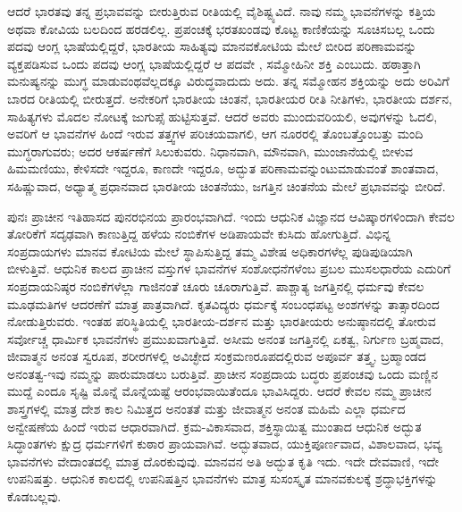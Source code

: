 ಆದರೆ ಭಾರತವು ತನ್ನ ಪ್ರಭಾವವನ್ನು ಬೀರುತ್ತಿರುವ ರೀತಿಯಲ್ಲಿ ವೈಶಿಷ್ಟ್ಯವಿದೆ. ನಾವು ನಮ್ಮ ಭಾವನೆಗಳನ್ನು ಕತ್ತಿಯ ಅಥವಾ ಕೋವಿಯ ಬಲದಿಂದ ಹರಡಲಿಲ್ಲ. ಪ್ರಪಂಚಕ್ಕೆ ಭರತಖಂಡವು ಕೊಟ್ಟ ಕಾಣಿಕೆಯನ್ನು ಸೂಚಿಸಬಲ್ಲ ಒಂದು ಪದವು ಆಂಗ್ಲ ಭಾಷೆಯಲ್ಲಿದ್ದರೆ, ಭಾರತೀಯ ಸಾಹಿತ್ಯವು ಮಾನವಕೋಟಿಯ ಮೇಲೆ ಬೀರಿದ ಪರಿಣಾಮವನ್ನು ವ್ಯಕ್ತಪಡಿಸುವ ಒಂದು ಪದವು ಆಂಗ್ಲ ಭಾಷೆಯಲ್ಲಿದ್ದರೆ ಆ ಪದವೇ , ಸಮ್ಮೋಹಿನೀ ಶಕ್ತಿ ಎಂಬುದು. ಹಠಾತ್ತಾಗಿ ಮನುಷ್ಯನನ್ನು ಮುಗ್ಧ ಮಾಡುವಂಥವೆಲ್ಲದಕ್ಕೂ ವಿರುದ್ಧವಾದುದು ಅದು. ತನ್ನ ಸಮ್ಮೋಹನ ಶಕ್ತಿಯನ್ನು ಅದು ಅರಿವಿಗೆ ಬಾರದ ರೀತಿಯಲ್ಲಿ ಬೀರುತ್ತದೆ. ಅನೇಕರಿಗೆ ಭಾರತೀಯ ಚಿಂತನೆ, ಭಾರತೀಯರ ರೀತಿ ನೀತಿಗಳು, ಭಾರತೀಯ ದರ್ಶನ, ಸಾಹಿತ್ಯಗಳು ಮೊದಲ ನೋಟಕ್ಕೆ ಜುಗುಪ್ಸೆ ಹುಟ್ಟಿಸುತ್ತವೆ. ಆದರೆ ಅವರು ಮುಂದುವರಿಯಲಿ, ಅವುಗಳನ್ನು ಓದಲಿ, ಅವರಿಗೆ ಆ ಭಾವನೆಗಳ ಹಿಂದೆ ಇರುವ ತತ್ತ್ವಗಳ ಪರಿಚಯವಾಗಲಿ, ಆಗ ನೂರರಲ್ಲಿ ತೊಂಬತ್ತೊಂಬತ್ತು ಮಂದಿ ಮುಗ್ಧರಾಗುವರು; ಅದರ ಆಕರ್ಷಣೆಗೆ ಸಿಲುಕುವರು. ನಿಧಾನವಾಗಿ, ಮೌನವಾಗಿ, ಮುಂಜಾನೆಯಲ್ಲಿ ಬೀಳುವ ಹಿಮಮಣಿಯು, ಕೇಳಿಸದೇ ಇದ್ದರೂ, ಕಾಣದೇ ಇದ್ದರೂ, ಅದ್ಭುತ ಪರಿಣಾಮವನ್ನುಂಟುಮಾಡುವಂತೆ ಶಾಂತವಾದ, ಸಹಿಷ್ಣುವಾದ, ಅಧ್ಯಾತ್ಮ ಪ್ರಧಾನವಾದ ಭಾರತೀಯ ಚಿಂತನೆಯು, ಜಗತ್ತಿನ ಚಿಂತನೆಯ ಮೇಲೆ ಪ್ರಭಾವವನ್ನು ಬೀರಿದೆ.

ಪುನಃ ಪ್ರಾಚೀನ ಇತಿಹಾಸದ ಪುನರಭಿನಯ ಪ್ರಾರಂಭವಾಗಿದೆ. ಇಂದು ಆಧುನಿಕ ವಿಜ್ಞಾನದ ಆವಿಷ್ಕಾರಗಳಿಂದಾಗಿ ಕೇವಲ ತೋರಿಕೆಗೆ ಸದೃಢವಾಗಿ ಕಾಣುತ್ತಿದ್ದ ಹಳೆಯ ನಂಬಿಕೆಗಳ ಅಡಿಪಾಯವೇ ಕುಸಿದು ಹೋಗುತ್ತಿದೆ. ವಿಭಿನ್ನ ಸಂಪ್ರದಾಯಗಳು ಮಾನವ ಕೋಟಿಯ ಮೇಲೆ ಸ್ಥಾಪಿಸುತ್ತಿದ್ದ ತಮ್ಮ ವಿಶೇಷ ಅಧಿಕಾರಗಳೆಲ್ಲ ಪುಡಿಪುಡಿಯಾಗಿ ಬೀಳುತ್ತಿವೆ. ಆಧುನಿಕ ಕಾಲದ ಪ್ರಾಚೀನ ವಸ್ತುಗಳ ಭಾವನೆಗಳ ಸಂಶೋಧನೆಗಳೆಂಬ ಪ್ರಬಲ ಮುಸಲಧಾರೆಯ ಎದುರಿಗೆ ಸಂಪ್ರದಾಯನಿಷ್ಠರ ನಂಬಿಕೆಗಳೆಲ್ಲಾ ಗಾಜಿನಂತೆ ಚೂರು ಚೂರಾಗುತ್ತಿವೆ. ಪಾಶ್ಚಾತ್ಯ ಜಗತ್ತಿನಲ್ಲಿ ಧರ್ಮವು ಕೇವಲ ಮೂಢಮತಿಗಳ ಆದರಣೆಗೆ ಮಾತ್ರ ಪಾತ್ರವಾಗಿದೆ. ಕೃತವಿದ್ಯರು ಧರ್ಮಕ್ಕೆ ಸಂಬಂಧಪಟ್ಟ ಅಂಶಗಳನ್ನು ತಾತ್ಸಾರದಿಂದ ನೋಡುತ್ತಿರುವರು. ಇಂತಹ ಪರಿಸ್ಥಿತಿಯಲ್ಲಿ ಭಾರತೀಯ-ದರ್ಶನ ಮತ್ತು ಭಾರತೀಯರು ಅನುಷ್ಠಾನದಲ್ಲಿ ತೋರುವ ಸರ್ವೋಚ್ಚ ಧಾರ್ಮಿಕ ಭಾವನೆಗಳು ಪ್ರಮುಖವಾಗುತ್ತಿವೆ. ಅಸೀಮ ಅನಂತ ಜಗತ್ತಿನಲ್ಲಿ ಏಕತ್ವ, ನಿರ್ಗುಣ ಬ್ರಹ್ಮವಾದ, ಜೀವಾತ್ಮನ ಅನಂತ ಸ್ವರೂಪ, ಶರೀರಗಳಲ್ಲಿ ಅವಿಚ್ಛೇದ ಸಂಕ್ರಮಣರೂಪದಲ್ಲಿರುವ ಅಪೂರ್ವ ತತ್ತ್ವ, ಬ್ರಹ್ಮಾಂಡದ ಅನಂತತ್ವ-ಇವು ನಮ್ಮನ್ನು ಪಾರುಮಾಡಲು ಬರುತ್ತಿವೆ. ಪ್ರಾಚೀನ ಸಂಪ್ರದಾಯ ಬದ್ಧರು ಪ್ರಪಂಚವು ಒಂದು ಮಣ್ಣಿನ ಮುದ್ದೆ ಎಂದೂ ಸೃಷ್ಟಿ ಮೊನ್ನೆ ಮೊನ್ನೆಯಷ್ಟೆ ಆರಂಭವಾಯಿತೆಂದೂ ಭಾವಿಸಿದ್ದರು. ಆದರೆ ಕೇವಲ ನಮ್ಮ ಪ್ರಾಚೀನ ಶಾಸ್ತ್ರಗಳಲ್ಲಿ ಮಾತ್ರ ದೇಶ ಕಾಲ ನಿಮಿತ್ತದ ಅನಂತತೆ ಮತ್ತು ಜೀವಾತ್ಮನ ಅನಂತ ಮಹಿಮೆ ಎಲ್ಲಾ ಧರ್ಮದ ಅನ್ವೇಷಣೆಯ ಹಿಂದೆ ಇರುವ ಆಧಾರವಾಗಿದೆ. ಕ್ರಮ-ವಿಕಾಸವಾದ, ಶಕ್ತಿಸ್ಥಾಯಿತ್ವ  ಮುಂತಾದ ಆಧುನಿಕ ಅದ್ಭುತ ಸಿದ್ಧಾಂತಗಳು ಕ್ಷುದ್ರ ಧರ್ಮಗಳಿಗೆ ಕುಠಾರ ಪ್ರಾಯವಾಗಿವೆ. ಅದ್ಭುತವಾದ, ಯುಕ್ತಿಪೂರ್ಣವಾದ, ವಿಶಾಲವಾದ, ಭವ್ಯ ಭಾವನೆಗಳು ವೇದಾಂತದಲ್ಲಿ ಮಾತ್ರ ದೊರಕುವುವು. ಮಾನವನ ಅತಿ ಅದ್ಭುತ ಕೃತಿ ಇದು. ಇದೇ ದೇವವಾಣಿ, ಇದೇ ಉಪನಿಷತ್ತು. ಆಧುನಿಕ ಕಾಲದಲ್ಲಿ ಉಪನಿಷತ್ತಿನ ಭಾವನೆಗಳು ಮಾತ್ರ ಸುಸಂಸ್ಕೃತ ಮಾನವಕುಲಕ್ಕೆ ಶ್ರದ್ಧಾಭಕ್ತಿಗಳನ್ನು ಕೊಡಬಲ್ಲವು.

\newpage

